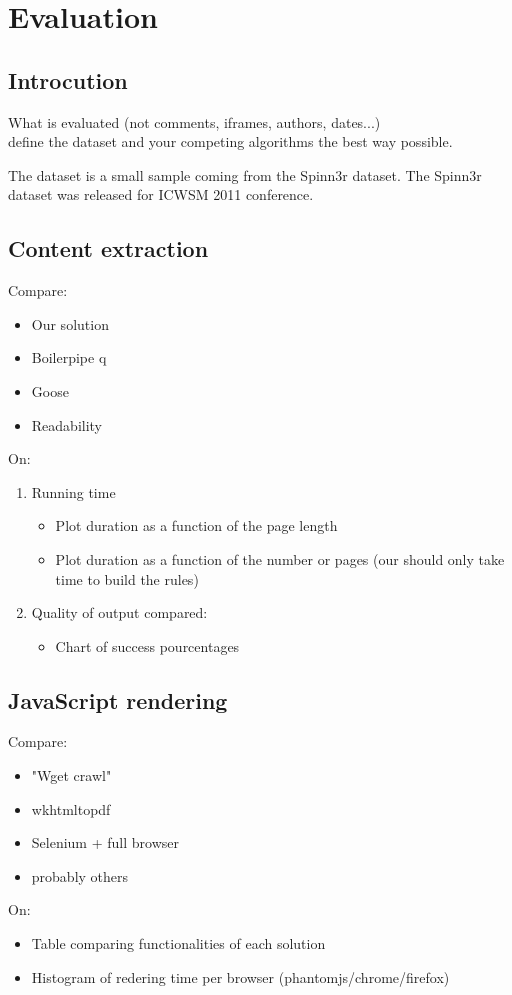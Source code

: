 \section{Evaluation}

\subsection{Introcution}
What is evaluated (not comments, iframes, authors, dates...)
\\ define the dataset and your competing algorithms the best way possible.

The dataset is a small sample coming from the Spinn3r dataset. The Spinn3r dataset was released for ICWSM 2011 conference.

\subsection{Content extraction}
Compare:
\begin{itemize}
  \item Our solution
  \item Boilerpipe q
  \item Goose 
  \item Readability 
\end{itemize}
On:
\begin{enumerate}
  \item Running time
  \begin{itemize}
    \item Plot duration as a function of the page length
    \item Plot duration as a function of the number or pages (our should only take time to build the rules)
  \end{itemize}
  \item Quality of output compared:
  \begin{itemize}
    \item Chart of success pourcentages
  \end{itemize}
\end{enumerate}

\subsection{JavaScript rendering}
Compare:
\begin{itemize}
  \item "Wget crawl" 
  \item wkhtmltopdf 
  \item Selenium + full browser
  \item probably others
\end{itemize}
On:
\begin{itemize}
  \item Table comparing functionalities of each solution
  \item Histogram of redering time per browser (phantomjs/chrome/firefox)
\end{itemize}
